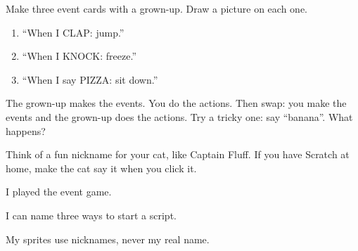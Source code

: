 
\begin{playathome}
Make three event cards with a grown-up. Draw a picture on each one.
\begin{enumerate}[leftmargin=1.4em,itemsep=2pt]
  \item \enquote{When I CLAP: jump.}
  \item \enquote{When I KNOCK: freeze.}
  \item \enquote{When I say PIZZA: sit down.}
\end{enumerate}
The grown-up makes the events. You do the actions. Then swap: you make the events and the grown-up does the actions. Try a tricky one: say \enquote{banana}. What happens?
\end{playathome}

\begin{playathome}
Think of a fun nickname for your cat, like Captain Fluff. If you have Scratch at home, make the cat say it when you click it.
\end{playathome}

\begin{selfcheck}
  \item I played the event game.
  \item I can name three ways to start a script.
  \item My sprites use nicknames, never my real name.
\end{selfcheck}
